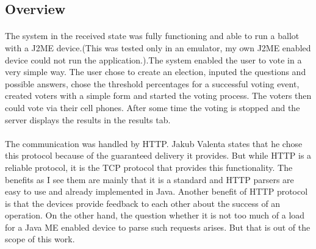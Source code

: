 \documentclass[11pt,twoside,a4paper]{book}
\begin{document}
\subsection{Overview}
\paragraph{}
The system in the received state was fully functioning and able to run a ballot with a J2ME device.(This was tested only in an emulator, my own J2ME enabled device could not run the application.).The system enabled the user to vote in a very simple way. The user chose to create an election, inputed the questions and possible answers, chose the threshold percentages for a successful voting event, created voters with a simple form and started the voting process. The voters then could vote via their cell phones. After some time the voting is stopped and the server displays the results in the results tab. \paragraph{}
The communication was handled by HTTP. Jakub Valenta\cite{bakalarkaJV} states that he chose this protocol because of the guaranteed delivery it provides. But while HTTP is a reliable protocol, it is the TCP protocol that provides this functionality. The benefits as I see them are mainly that it is a standard and HTTP parsers are easy to use and already implemented in Java. Another benefit of HTTP protocol is that the devices provide feedback to each other about the success of an operation. On the other hand, the question whether it is not too much of a load for a Java ME enabled device to parse such requests arises. But that is out of the scope of this work.
\end{document}
